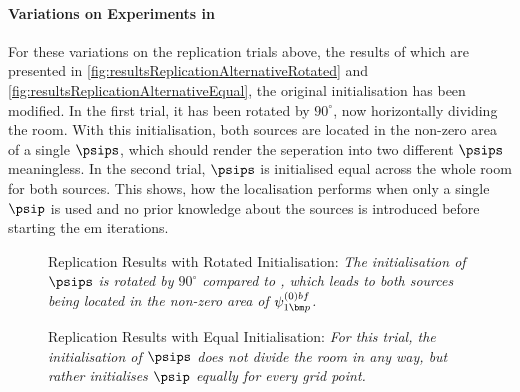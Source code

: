 \paragraph{Variations on Experiments in \citeauthor{Schwartz2014} \citeyearpar{Schwartz2014}}
For these variations on the replication trials above, the results of which are presented in \autoref{fig:resultsReplicationAlternativeRotated} and \autoref{fig:resultsReplicationAlternativeEqual}, the original initialisation has been modified. In the first trial, it has been rotated by $90^{\circ}$, now horizontally dividing the room. With this initialisation, both sources are located in the non-zero area of a single $\psips$, which should render the seperation into two different $\psips$ meaningless. In the second trial, 
$\psips$ is initialised equal across the whole room for both sources. This shows, how the localisation performs when only a single $\psip$ is used and no prior knowledge about the sources is introduced before starting the \gls{em} iterations.

\begin{figure}[!htbp]
\centering
    \iftoggle{quick}{%
		\texttt{[image: plots/schwartz2014-variation/s=2-sloc=schwartz2014-T60=0.7-prior=schwartz2014-unlucky-results]}
		}{%
			\setlength{\figurewidth}{\textwidth}
    
		}
	\caption[Replication Results with Rotated Initialisation]{Replication Results with Rotated Initialisation: \itshape The initialisation of $\psips$ is rotated by $90^{\circ}$ compared to \cite{Schwartz2014}, which leads to both sources being located in the non-zero area of $\psi_{1\bm p}^{\text(0)bf}$.}
	\label{fig:resultsReplicationAlternativeRotated}
\end{figure}

\begin{figure}[!htbp]
\centering
    \iftoggle{quick}{%
		\texttt{[image: plots/schwartz2014-variation/s=2-sloc=schwartz2014-T60=0.7-prior=equal-results]}
		}{%
			\setlength{\figurewidth}{\textwidth}
    
		}
	\caption[Replication Results with Equal Initialisation]{Replication Results with Equal Initialisation: \itshape For this trial, the initialisation of $\psips$ does not divide the room in any way, but rather initialises $\psip$ equally for every grid point.}
	\label{fig:resultsReplicationAlternativeEqual}
\end{figure}

